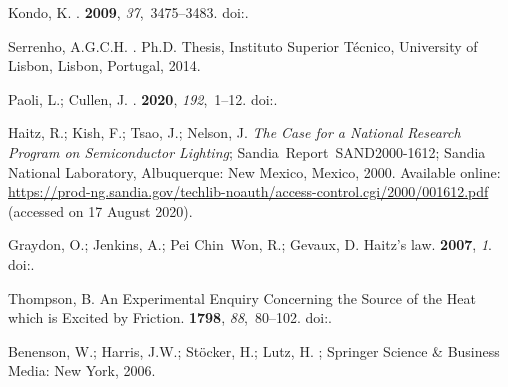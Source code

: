 \documentclass[energies,article,accept,moreauthors,pdftex]{Definitions/mdpi}\usepackage[]{graphicx}\usepackage[]{color}
\begin{document}
\begin{thebibliography}{999}
Kondo, K.
.
 {\bf 2009}, {\em 37},~3475--3483.
\newblock
  doi:{\href{https://doi.org/10.1016/j.enpol.2009.05.060}{}}.%

Serrenho, A.G.C.H.
.
\newblock Ph.D. Thesis, Instituto Superior T{\'{e}}cnico, University of Lisbon,
  Lisbon, Portugal,  2014.%

Paoli, L.; Cullen, J.
.
 {\bf 2020}, {\em 192},~1--12.
\newblock
  doi:{\href{https://doi.org/10.1016/j.energy.2019.116228}{}}.%

Haitz, R.; Kish, F.; Tsao, J.; Nelson, J.
\newblock \emph{The Case for a National Research Program on Semiconductor
  Lighting};
\newblock \mbox{Sandia Report SAND2000-1612}; Sandia National Laboratory, Albuquerque:
  New Mexico, Mexico,  2000.  Available online: 
  \url{https://prod-ng.sandia.gov/techlib-noauth/access-control.cgi/2000/001612.pdf}  (accessed on 17 August 2020). %


Graydon, O.; Jenkins, A.; Pei Chin~Won, R.; Gevaux, D.
\newblock Haitz's law.
 {\bf 2007}, {\em 1}.%
\newblock
  doi:{\href{https://doi.org/10.1038/nphoton.2006.78}{}}.


Thompson, B.
\newblock An Experimental Enquiry Concerning the Source of the Heat which is
  Excited by Friction.
 {\bf
  1798}, {\em 88},~80--102.
\newblock
  doi:{\href{https://doi.org/10.1098/rstl.1798.0006}{}}. %

Benenson, W.; Harris, J.W.; St{\"o}cker, H.; Lutz, H.
; Springer Science \& Business Media:  New York,  2006.%


\end{thebibliography}
\end{document}
